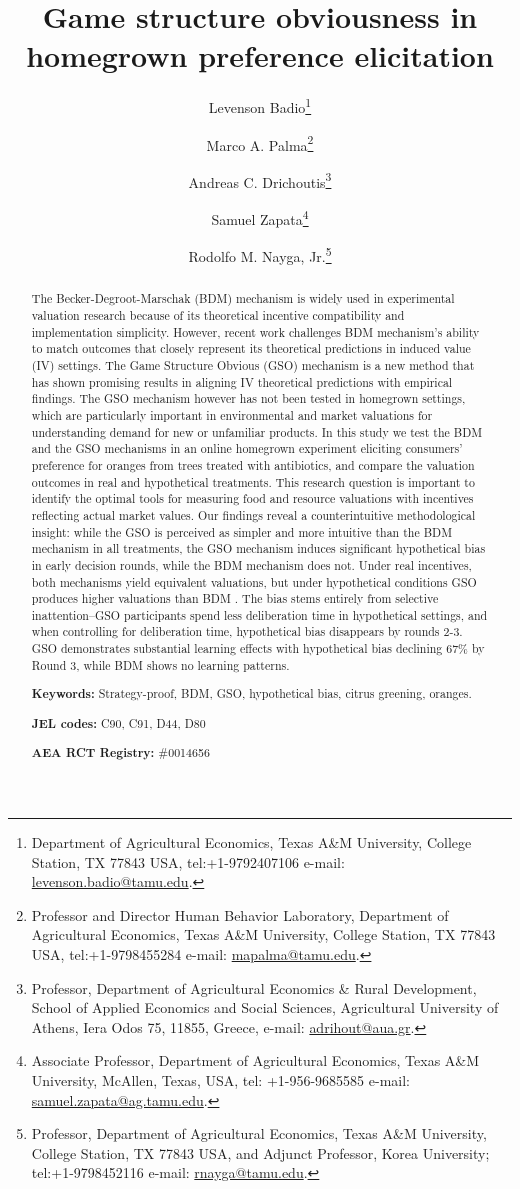 \documentclass[12pt]{article}
\title{\textbf{Game structure obviousness in homegrown preference elicitation}}
\author[1]{Levenson Badio\thanks{Department of Agricultural Economics, Texas A\&M University, College Station, TX  77843 USA, tel:+1-9792407106 e-mail: \href{mailto:levenson.badio@tamu.edu}{levenson.badio@tamu.edu}.}}
\author[1]{Marco A. Palma\thanks{Professor and Director Human Behavior Laboratory, Department of Agricultural Economics, Texas A\&M University, College Station, TX  77843 USA, tel:+1-9798455284 e-mail: \href{mailto:mapalma@tamu.edu}{mapalma@tamu.edu}.}}
\author[2]{Andreas C. Drichoutis\thanks{Professor, Department of Agricultural Economics \& Rural Development, School of Applied Economics and Social Sciences, Agricultural University of Athens, Iera Odos 75, 11855, Greece, e-mail: \href{mailto:adrihout@aua.gr}{adrihout@aua.gr}.}}
\author[1]{Samuel Zapata\thanks{Associate Professor, Department of Agricultural Economics, Texas A\&M University, McAllen, Texas, USA, tel: +1-956-9685585 e-mail: \href{samuel.zapata@ag.tamu.edu}{samuel.zapata@ag.tamu.edu}.}}
\author[1]{Rodolfo M. Nayga, Jr.\thanks{Professor, Department of Agricultural Economics, Texas A\&M University, College Station, TX  77843 USA, and Adjunct Professor, Korea University; tel:+1-9798452116 e-mail: \href{mailto:rnayga@tamu.edu}{rnayga@tamu.edu}.}}
\affil[1]{Texas A\&M University}
\affil[2]{Agricultural University of Athens}
\date{}
\begin{document}
\maketitle
 \onehalfspacing

\begin{abstract}
\noindent The Becker-Degroot-Marschak (BDM) mechanism is widely used in experimental valuation research because of its theoretical incentive compatibility and implementation simplicity. However, recent work challenges BDM mechanism's ability to match outcomes that closely represent its theoretical predictions in induced value (IV) settings. The Game Structure Obvious (GSO) mechanism is a new method that has shown promising results in aligning IV theoretical predictions with empirical findings. The GSO mechanism however has not been tested in homegrown settings, which are particularly important in environmental and market valuations for understanding demand for new or unfamiliar products. In this study we test the BDM and the GSO mechanisms in an online homegrown experiment eliciting consumers' preference for oranges from trees treated with antibiotics, and compare the valuation outcomes in real and hypothetical treatments. This research question is important to identify the optimal tools for measuring food and resource valuations with incentives reflecting actual market values. Our findings reveal a counterintuitive methodological insight: while the GSO is perceived as simpler and more intuitive than the BDM mechanism in all treatments, the GSO mechanism induces significant hypothetical bias in early decision rounds, while the BDM mechanism does not. Under real incentives, both mechanisms yield equivalent valuations, but under hypothetical conditions GSO produces  higher valuations than BDM . The bias stems entirely from selective inattention--GSO participants spend less deliberation time in hypothetical settings, and when controlling for deliberation time, hypothetical bias disappears by rounds 2-3. GSO demonstrates substantial learning effects with hypothetical bias declining 67\% by Round 3, while BDM shows no learning patterns.

\textbf{Keywords:} Strategy-proof, BDM, GSO, hypothetical bias, citrus greening, oranges. 
	
\textbf{JEL codes:} C90, C91, D44, D80
 
 \textbf{AEA RCT Registry:} \#0014656
 
 \end{abstract}


\onehalfspacing
\end{document}
